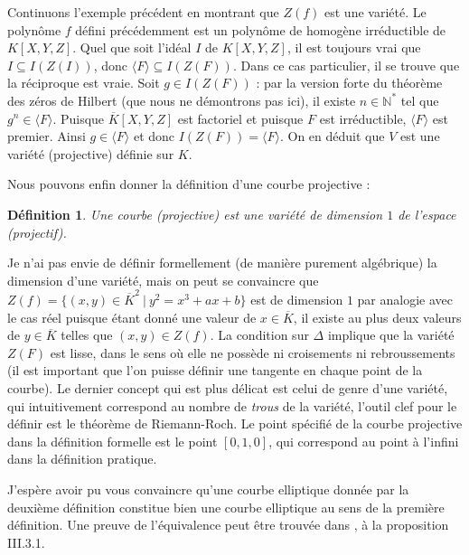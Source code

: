 \documentclass{article}
\theoremstyle{plain}%
\newtheorem{deff}[thm]{Définition}
\theoremstyle{definition}%
\newcommand{\N}{\mathbb{N}}
\newcommand{\ol}{\overline}
\begin{document}
Continuons l'exemple précédent en montrant que $Z(f)$ est une variété.
  Le polynôme $f$ défini précédemment est un polynôme de homogène irréductible de $K[X, Y, Z]$.   
  Quel que soit l'idéal $I$ de $K[X, Y, Z]$, il est toujours vrai que $I \subseteq I(Z(I))$, donc $\langle F \rangle \subseteq I(Z( F ))$. 
  Dans ce cas particulier, il se trouve que la réciproque est vraie. Soit $g\in I(Z(F))$ : par la version forte du théorème des zéros de Hilbert (que nous ne démontrons pas ici), il existe $n\in\N^*$ tel que $g^n\in \langle F \rangle$.
  Puisque $\ol K[X, Y, Z]$ est factoriel et puisque $F$ est irréductible,  $\langle F \rangle$ est premier. Ainsi $g\in \langle F \rangle$ et donc $I(Z(F)) = \langle F \rangle$.
  On en déduit que $V$ est une variété (projective) définie sur $K$.

  Nous pouvons enfin donner la définition d'une courbe projective :

\begin{deff}
  Une courbe (projective) est une variété de dimension $1$ de l'espace (projectif).
\end{deff}


Je n'ai pas envie de définir formellement (de manière purement algébrique) la dimension d'une variété, mais on peut se convaincre que $Z(f) = \{(x, y)\in \ol K^2\ |\ y^2 = x^3 + ax + b\}$ est de dimension $1$ par analogie avec le cas réel puisque étant donné une valeur de $x\in\ol K$, il existe au plus deux valeurs de $y\in\ol K$ telles que $(x, y)\in Z(f)$. 
La condition sur $\Delta$ implique que la variété $Z(F)$ est lisse, dans le sens où elle ne possède ni croisements ni rebroussements (il est important que l'on puisse définir une tangente en chaque point de la courbe). Le dernier concept qui est plus délicat est celui de genre d'une variété, qui intuitivement correspond au nombre de \emph{trous} de la variété, l'outil clef pour le définir est le théorème de Riemann-Roch.
Le point spécifié de la courbe projective dans la définition formelle est le point $[0, 1, 0]$, qui correspond au point à l'infini dans la définition pratique.

J'espère avoir pu vous convaincre qu'une courbe elliptique donnée par la deuxième définition constitue bien une courbe elliptique au sens de la première définition. Une preuve de l'équivalence peut être trouvée dans \cite{Silverman}, à la proposition III.3.1.
\end{document}
